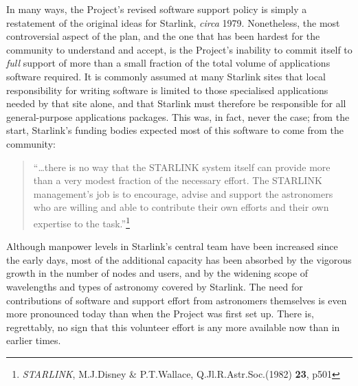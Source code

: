 In many ways, the Project's revised software support policy
is simply a restatement of the original ideas for Starlink,
{\it circa} 1979.  Nonetheless, the most controversial
aspect of the plan, and the one that has been hardest for
the community to understand and accept, is the Project's inability
to commit itself to {\it full} support of more than a
small fraction of the total volume of applications software required.
It is commonly assumed at many Starlink sites
that local responsibility for writing software is limited to
those specialised applications needed by that site alone, and that
Starlink must therefore be responsible for all general-purpose
applications packages.  This was, in fact, never the case;
from the start, Starlink's funding bodies expected most of this software to
come from the community:
\begin{quotation}
``\ldots there is no way that the {\small STARLINK} system itself
can provide more than a very modest fraction of the necessary
effort.  The {\small STARLINK} management's job is to
encourage, advise and support the astronomers who are willing and
able to contribute their own efforts and their own expertise to the
task.''\footnote{{\it STARLINK}, M.J.Disney \& P.T.Wallace,
Q.Jl.R.Astr.Soc.(1982) {\bf 23}, p501}
\end{quotation}
Although manpower levels in Starlink's central
team have been increased since
the early days, most of the additional capacity has been absorbed
by the vigorous growth in the number of nodes and
users, and by the widening scope of wavelengths and types
of astronomy covered by Starlink.  The need for contributions of
software and support effort from astronomers themselves
is even more pronounced today than when the Project was first
set up.  There is, regrettably, no sign that this volunteer
effort is any more available now than in earlier times.

